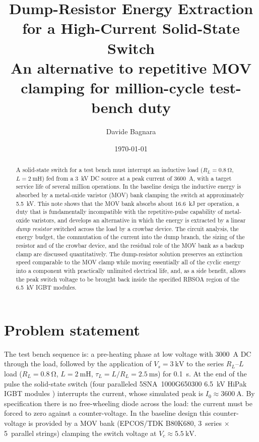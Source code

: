 \documentclass[11pt,a4paper]{article}
\title{Dump-Resistor Energy Extraction for a High-Current Solid-State Switch\\
\large An alternative to repetitive MOV clamping for million-cycle test-bench duty}
\author{Davide Bagnara}
\date{\today}
\begin{document}
\maketitle

\begin{abstract}
A solid-state switch for a test bench must interrupt an inductive load
($R_L=\SI{0.8}{\ohm}$, $L=\SI{2}{\milli\henry}$) fed from a \SI{3}{\kilo\volt}
DC source at a peak current of \SI{3600}{\ampere}, with a target service life
of several million operations. In the baseline design the inductive energy is
absorbed by a metal-oxide varistor (MOV) bank clamping the switch at
approximately \SI{5.5}{\kilo\volt}. This note shows that the MOV bank absorbs
about \SI{16.6}{\kilo\joule} per operation, a duty that is fundamentally
incompatible with the repetitive-pulse capability of metal-oxide varistors,
and develops an alternative in which the energy is extracted by a linear
\emph{dump resistor} switched across the load by a crowbar device. The circuit
analysis, the energy budget, the commutation of the current into the dump
branch, the sizing of the resistor and of the crowbar device, and the residual
role of the MOV bank as a backup clamp are discussed quantitatively. The
dump-resistor solution preserves an extinction speed comparable to the MOV
clamp while moving essentially all of the cyclic energy into a component with
practically unlimited electrical life, and, as a side benefit, allows the peak
switch voltage to be brought back inside the specified RBSOA region of the
\SI{6.5}{\kilo\volt} IGBT modules.
\end{abstract}

\section{Problem statement}
\label{sec:problem}

The test bench sequence is: a pre-heating phase at low voltage with
\SI{3000}{\ampere} DC through the load, followed by the application of
$V_s=\SI{3}{\kilo\volt}$ to the series $R_L$--$L$ load
($R_L=\SI{0.8}{\ohm}$, $L=\SI{2}{\milli\henry}$, $\tau_L = L/R_L =
\SI{2.5}{\milli\second}$) for \SI{0.1}{\second}. At the end of the pulse the
solid-state switch (four paralleled 5SNA~1000G650300 \SI{6.5}{\kilo\volt}
HiPak IGBT modules \cite{hipak}) interrupts the current, whose simulated peak
is $I_0 \approx \SI{3600}{\ampere}$. By specification there is no free-wheeling
diode across the load: the current must be forced to zero against a
counter-voltage. In the baseline design this counter-voltage is provided by a
MOV bank (EPCOS/TDK B80K680, 3~series $\times$ 5~parallel strings) clamping
the switch voltage at $V_c \approx \SI{5.5}{\kilo\volt}$.
\end{document}
